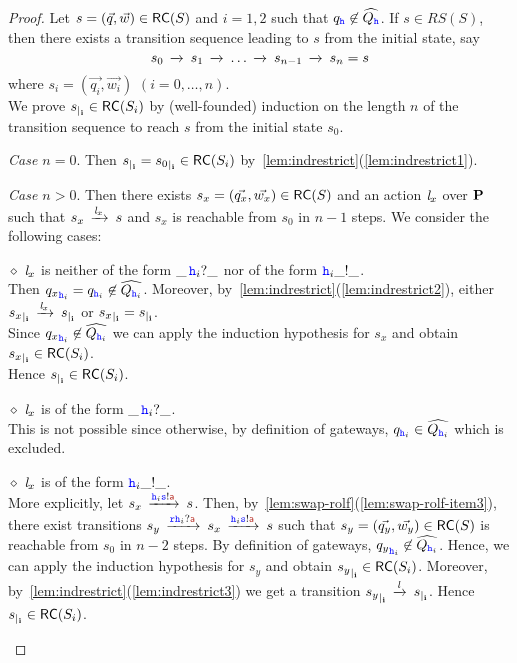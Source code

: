 \begin{proof}
Let $s = (\vec{q},\vec{w}) \in \mathsf{RC}(S)$ and $i=1,2$ such that ${q}_{{\mathtt{\color{blue}{ {h}}}}}\not\in\widehat{Q_{{\mathtt{\color{blue}{ {h}}}}}}$.
If $s \in RS(S)$, then there exists a transition sequence leading to $s$ from the initial state, say
$$s_0\,\xrightarrow{}_{{}}\,s_1\,\xrightarrow{}_{{}}\, \ldots\,\xrightarrow{}_{{}}\, s_{n-1}\,\xrightarrow{}_{{}}\,s_n=s$$
where $s_i = (\vec{q_i},\vec{w_i})$ $(i=0,\ldots,n)$.\\
We prove ${s}_{\mid_{\mathbf{i}}}\in \mathsf{RC}(S_i)$  by (well-founded) induction on the length $n$ of the transition sequence to reach $s$ from the initial state $s_0$.

{\em Case $n=0$}. Then ${s}_{\mid_{\mathbf{i}}} = {s_0}_{\mid_{\mathbf{i}}} \in \mathsf{RC}(S_i)$
by~\cref{lem:indrestrict}(\ref{lem:indrestrict1}).


{\em Case $n>0$}.
Then there exists $s_x = (\vec{q_x},\vec{w_x}) \in \mathsf{RC}(S)$ and an action $\mathit{l}_x$ over $\mathbf{P}$
such that $s_x\,\xrightarrow{\mathit{l}_x}_{{}}\,s$ and $s_x$ is reachable from $s_0$ in $n-1$ steps. We consider the following cases:

\begin{description}
%
\item
\underline{$\diamond$}
$\mathit{l}_x$ is neither of the form $\_\,{\mathtt{\color{blue}{ {h}}}}_i?\_$ nor of the form ${\mathtt{\color{blue}{ {h}}}}_i\_!\_$.\\
Then ${q_x}_{{\mathtt{\color{blue}{ {h}}}}_i}={q}_{{\mathtt{\color{blue}{ {h}}}}_i}\not\in\widehat{Q_{{\mathtt{\color{blue}{ {h}}}}_i}}$.
Moreover, by~\cref{lem:indrestrict}(\ref{lem:indrestrict2}),
either ${s_x}_{\mid_{\mathbf{i}}}\,\xrightarrow{\mathit{l}_x}_{{}}\,{s}_{\mid_{\mathbf{i}}}$ or  ${s_x}_{\mid_{\mathbf{i}}}={s}_{\mid_{\mathbf{i}}}$.\\
Since ${q_x}_{{\mathtt{\color{blue}{ {h}}}}_i}\not\in\widehat{Q_{{\mathtt{\color{blue}{ {h}}}}_i}}$ we can apply the induction hypothesis for $s_x$ and obtain ${s_x}_{\mid_{\mathbf{i}}}\in \mathsf{RC}(S_i)$.\\
Hence ${s}_{\mid_{\mathbf{i}}}\in \mathsf{RC}(S_i)$.
%
\item
\underline{$\diamond$}
$\mathit{l}_x$ is of the form $\_\,{\mathtt{\color{blue}{ {h}}}}_i?\_$.\\
This is not possible since otherwise,
by definition of gateways,
${q}_{{\mathtt{\color{blue}{ {h}}}}_i}\in\widehat{Q_{{\mathtt{\color{blue}{ {h}}}}_i}}$ which is excluded. 
%
\item
\underline{$\diamond$}
$\mathit{l}_x$ is of the form ${\mathtt{\color{blue}{ {h}}}}_i\_!\_$.\\
More explicitly, let $s_x\lts{\HH_i\tts!\msg[a]}s$.
Then, by~\cref{lem:swap-rolf}(\ref{lem:swap-rolf-item3}), there exist
transitions
$s_y \lts{\ttr\HH_i?\msg[a]}s_x\lts{\HH_i\tts!\msg[a]}s$
such that $s_y = (\vec{q_y},\vec{w_y})\in \mathsf{RC}(S)$ is reachable from $s_0$ in $n-2$ steps. By definition of gateways, ${q_y}_{{\mathtt{\color{blue}{ {h}}}}_i} \not\in\widehat{Q_{{\mathtt{\color{blue}{ {h}}}}_i}}$.
Hence, we can apply the induction hypothesis for $s_y$ and obtain ${s_y}_{\mid_{\mathbf{i}}}\in \mathsf{RC}(S_i)$.
Moreover, by~\cref{lem:indrestrict}(\ref{lem:indrestrict3}) we get a transition
${s_y}_{\mid_{\mathbf{i}}}\,\xrightarrow{\mathit{l}}_{{}}\,{s}_{\mid_{\mathbf{i}}}$. Hence ${s}_{\mid_{\mathbf{i}}}\in \mathsf{RC}(S_i)$.
\end{description}


\end{proof}
